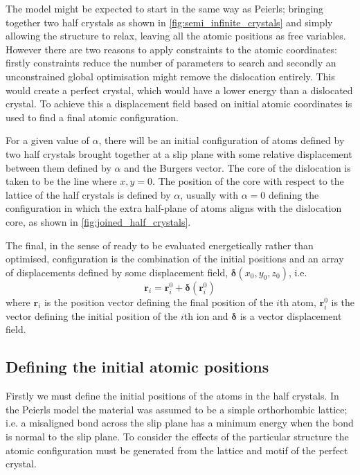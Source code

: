 


The model might be expected to start in the same way as Peierls; bringing together two half crystals as shown in \autoref{fig:semi_infinite_crystals} and simply allowing the structure to relax, leaving all the atomic positions as free variables. However there are two reasons to apply constraints to the atomic coordinates: firstly constraints reduce the number of parameters to search and secondly an unconstrained global optimisation might remove the dislocation entirely. This would create a perfect crystal, which would have a lower energy than a dislocated crystal. To achieve this a displacement field based on initial atomic coordinates is used to find a final atomic configuration.

For a given value of $\alpha$, there will be an initial configuration of atoms defined by two half crystals brought together at a slip plane with some relative displacement between them defined by $\alpha$ and the Burgers vector. The core of the dislocation is taken to be the line where $x,y = 0$. The position of the core with respect to the lattice of the half crystals is defined by $\alpha$, usually with $\alpha=0$ defining the configuration in which the extra half-plane of atoms aligns with the dislocation core, as shown in \autoref{fig:joined_half_crystals}. 

The final, in the sense of ready to be evaluated energetically rather than optimised, configuration is the combination of  the initial positions and an array of displacements defined by some displacement field, $\bm{\delta}(x_0, y_0, z_0)$, i.e.
\begin{equation}
\mathbf{r}_i = \mathbf{r}_i^0 + \bm{\delta}(\bm{r}_i^0)
\end{equation}
where $\mathbf{r}_i$ is the position vector defining the final position of the $i$th atom, $\mathbf{r}_i^0$ is the vector defining the initial position of the $i$th ion and $\bm{\delta}$ is a vector displacement field.


%
%
\subsection{Defining the initial atomic positions}


Firstly we must define the initial positions of the atoms in the half crystals. In the Peierls model the material was assumed to be a simple orthorhombic lattice; i.e. a misaligned  bond across the slip plane has a minimum energy when the bond is normal to the slip plane. To consider the effects of the particular structure the atomic configuration must be generated from the lattice and motif of the perfect crystal.


